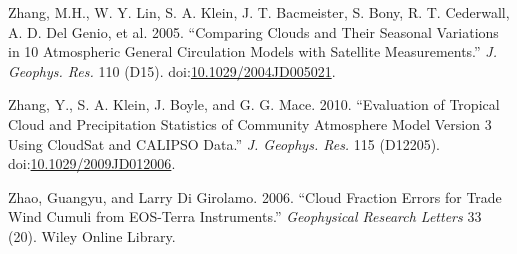 \hypertarget{ref-zhangux5fetux5falux5f2005}{}
Zhang, M.H., W. Y. Lin, S. A. Klein, J. T. Bacmeister, S. Bony, R. T.
Cederwall, A. D. Del Genio, et al. 2005. ``Comparing Clouds and Their
Seasonal Variations in 10 Atmospheric General Circulation Models with
Satellite Measurements.'' \emph{J. Geophys. Res.} 110 (D15).
doi:\href{https://doi.org/10.1029/2004JD005021}{10.1029/2004JD005021}.

\hypertarget{ref-zhangux5fetux5falux5f2010}{}
Zhang, Y., S. A. Klein, J. Boyle, and G. G. Mace. 2010. ``Evaluation of
Tropical Cloud and Precipitation Statistics of Community Atmosphere
Model Version 3 Using CloudSat and CALIPSO Data.'' \emph{J. Geophys.
Res.} 115 (D12205).
doi:\href{https://doi.org/10.1029/2009JD012006}{10.1029/2009JD012006}.

\hypertarget{ref-zhaoux5fandux5fdigirolamoux5f2006}{}
Zhao, Guangyu, and Larry Di Girolamo. 2006. ``Cloud Fraction Errors for
Trade Wind Cumuli from EOS-Terra Instruments.'' \emph{Geophysical
Research Letters} 33 (20). Wiley Online Library.
